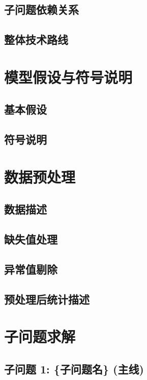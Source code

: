 \documentclass[12pt,a4paper]{ctexart}
\begin{document}
\subsection{子问题依赖关系}

\subsection{整体技术路线}

\section{模型假设与符号说明}

\subsection{基本假设}

\subsection{符号说明}

\section{数据预处理}

\subsection{数据描述}

\subsection{缺失值处理}

\subsection{异常值剔除}

\subsection{预处理后统计描述}

\section{子问题求解}

\subsection{子问题 1: \{子问题名\} (主线)}
\end{document}
